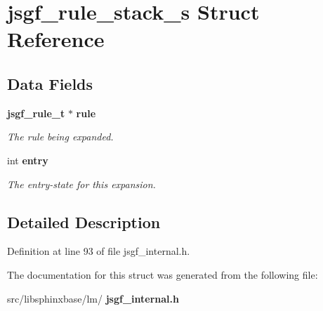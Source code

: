 \section{jsgf\+\_\+rule\+\_\+stack\+\_\+s Struct Reference}
\label{structjsgf__rule__stack__s}
\subsection*{Data Fields}
\begin{DoxyCompactItemize}
\item 
\mbox{\label{structjsgf__rule__stack__s_a5fd5facd2b790c949ef2efa80b07148a}} 
\textbf{ jsgf\+\_\+rule\+\_\+t} $\ast$ \textbf{ rule}
\begin{DoxyCompactList}\small\item\em The rule being expanded. \end{DoxyCompactList}\item 
\mbox{\label{structjsgf__rule__stack__s_a56107dc6cc50d45a5c1811785e8169b7}} 
int \textbf{ entry}
\begin{DoxyCompactList}\small\item\em The entry-\/state for this expansion. \end{DoxyCompactList}\end{DoxyCompactItemize}


\subsection{Detailed Description}


Definition at line 93 of file jsgf\+\_\+internal.\+h.



The documentation for this struct was generated from the following file\+:\begin{DoxyCompactItemize}
\item 
src/libsphinxbase/lm/\textbf{ jsgf\+\_\+internal.\+h}\end{DoxyCompactItemize}
